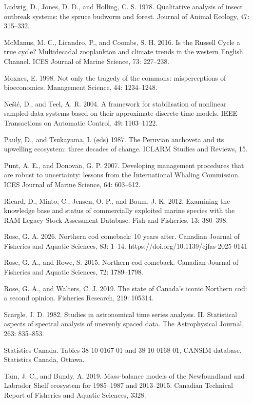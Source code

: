 \documentclass[11pt]{article}
\begin{document}
Ludwig, D., Jones, D. D., and Holling, C. S. 1978. Qualitative analysis
of insect outbreak systems: the spruce budworm and forest. Journal of
Animal Ecology, 47: 315--332.

McManus, M. C., Licandro, P., and Coombs, S. H. 2016. Is the Russell
Cycle a true cycle? Multidecadal zooplankton and climate trends in the
western English Channel. ICES Journal of Marine Science, 73: 227--238.

Moxnes, E. 1998. Not only the tragedy of the commons: misperceptions of
bioeconomics. Management Science, 44: 1234--1248.

Ne\v{s}i\'c, D., and Teel, A. R. 2004. A framework for stabilisation of
nonlinear sampled-data systems based on their approximate discrete-time
models. IEEE Transactions on Automatic Control, 49: 1103--1122.

Pauly, D., and Tsukayama, I. (eds) 1987. The Peruvian anchoveta and its
upwelling ecosystem: three decades of change. ICLARM Studies and
Reviews, 15.

Punt, A. E., and Donovan, G. P. 2007. Developing management procedures
that are robust to uncertainty: lessons from the International Whaling
Commission. ICES Journal of Marine Science, 64: 603--612.

Ricard, D., Minto, C., Jensen, O. P., and Baum, J. K. 2012. Examining
the knowledge base and status of commercially exploited marine species
with the RAM Legacy Stock Assessment Database. Fish and Fisheries, 13:
380--398.

Rose, G. A. 2026. Northern cod comeback: 10 years after. Canadian
Journal of Fisheries and Aquatic Sciences, 83: 1--14.
https://doi.org/10.1139/cjfas-2025-0141

Rose, G. A., and Rowe, S. 2015. Northern cod comeback. Canadian Journal
of Fisheries and Aquatic Sciences, 72: 1789--1798.

Rose, G. A., and Walters, C. J. 2019. The state of Canada's iconic
Northern cod: a second opinion. Fisheries Research, 219: 105314.

Scargle, J. D. 1982. Studies in astronomical time series analysis. II.
Statistical aspects of spectral analysis of unevenly spaced data. The
Astrophysical Journal, 263: 835--853.

Statistics Canada. Tables 38-10-0167-01 and 38-10-0168-01, CANSIM
database. Statistics Canada, Ottawa.

Tam, J. C., and Bundy, A. 2019. Mass-balance models of the Newfoundland
and Labrador Shelf ecosystem for 1985--1987 and 2013--2015. Canadian
Technical Report of Fisheries and Aquatic Sciences, 3328.
\end{document}
